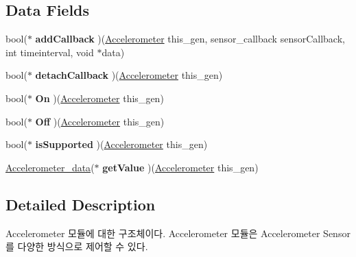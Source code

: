 \subsection*{Data Fields}
\begin{DoxyCompactItemize}
\item 
\hypertarget{struct__Accelerometer_a49a22e79a1d2f43397c0f2dd7b4b38b3}{bool($\ast$ {\bfseries add\-Callback} )(\hyperlink{struct__Accelerometer}{Accelerometer} this\-\_\-gen, sensor\-\_\-callback sensor\-Callback, int timeinterval, void $\ast$data)}\label{struct__Accelerometer_a49a22e79a1d2f43397c0f2dd7b4b38b3}

\item 
\hypertarget{struct__Accelerometer_a78f284559bbc8500ca54fa069369d4c6}{bool($\ast$ {\bfseries detach\-Callback} )(\hyperlink{struct__Accelerometer}{Accelerometer} this\-\_\-gen)}\label{struct__Accelerometer_a78f284559bbc8500ca54fa069369d4c6}

\item 
\hypertarget{struct__Accelerometer_a17eaafbdf2b40f38b82ad1cbb6025540}{bool($\ast$ {\bfseries On} )(\hyperlink{struct__Accelerometer}{Accelerometer} this\-\_\-gen)}\label{struct__Accelerometer_a17eaafbdf2b40f38b82ad1cbb6025540}

\item 
\hypertarget{struct__Accelerometer_ae9e0090f67466b06e0f14f59b4830990}{bool($\ast$ {\bfseries Off} )(\hyperlink{struct__Accelerometer}{Accelerometer} this\-\_\-gen)}\label{struct__Accelerometer_ae9e0090f67466b06e0f14f59b4830990}

\item 
\hypertarget{struct__Accelerometer_a0c01b8a5a915f39afb4429cbe3ee6d2c}{bool($\ast$ {\bfseries is\-Supported} )(\hyperlink{struct__Accelerometer}{Accelerometer} this\-\_\-gen)}\label{struct__Accelerometer_a0c01b8a5a915f39afb4429cbe3ee6d2c}

\item 
\hypertarget{struct__Accelerometer_a8c75dfb5dbc8f9da5ea69ef2fb597185}{\hyperlink{Sensor_8h_df/d29/struct__3d__data}{Accelerometer\-\_\-data}($\ast$ {\bfseries get\-Value} )(\hyperlink{struct__Accelerometer}{Accelerometer} this\-\_\-gen)}\label{struct__Accelerometer_a8c75dfb5dbc8f9da5ea69ef2fb597185}

\end{DoxyCompactItemize}


\subsection{Detailed Description}
Accelerometer 모듈에 대한 구조체이다. Accelerometer 모듈은 Accelerometer Sensor를 다양한 방식으로 제어할 수 있다. 

